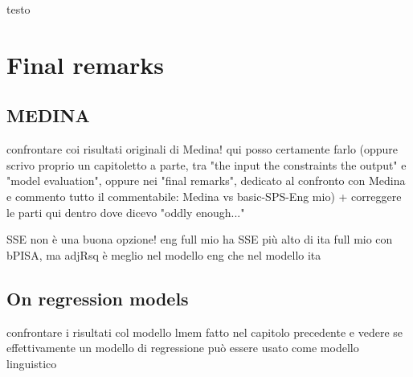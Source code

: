 testo



\section{Final remarks} 


\subsection{MEDINA} 

confrontare coi risultati originali di Medina! qui posso certamente farlo (oppure scrivo proprio un capitoletto a parte, tra "the input the constraints the output" e "model evaluation", oppure nei "final remarks", dedicato al confronto con Medina e commento tutto il commentabile: Medina vs basic-SPS-Eng mio) + correggere le parti qui dentro dove dicevo "oddly enough..."

SSE non è una buona opzione! eng full mio ha SSE più alto di ita full mio con bPISA, ma adjRsq è meglio nel modello eng che nel modello ita




\subsection{On regression models} 

confrontare i risultati col modello lmem fatto nel capitolo precedente e vedere se effettivamente un modello di regressione può essere usato come modello linguistico









